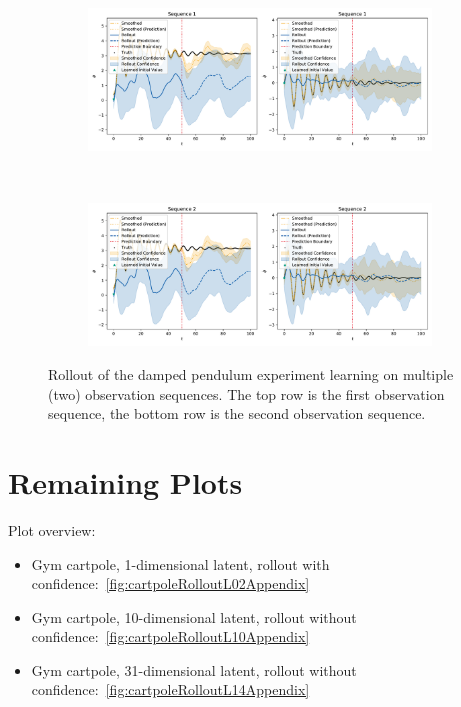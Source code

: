 	\begin{figure}
		\centering
		\begin{subfigure}{\linewidth}
			\includegraphics[width=\linewidth]{figures/results/single-vs-multi-sequence/pendulum-damped-multi/rollout-observations-N0.pdf}
		\end{subfigure} \\
		\begin{subfigure}{\linewidth}
			\includegraphics[width=\linewidth]{figures/results/single-vs-multi-sequence/pendulum-damped-multi/rollout-observations-N1.pdf}
		\end{subfigure}
		\caption{Rollout of the damped pendulum experiment learning on multiple (two) observation sequences. The top row is the first observation sequence, the bottom row is the second observation sequence.}
		\label{fig:plotsMultiSequence}
	\end{figure}

\section{Remaining Plots}
	\label{app:remainingPlots}

	Plot overview:
	\begin{itemize}
		\item Gym cartpole, 1-dimensional latent, rollout with confidence:~\autoref{fig:cartpoleRolloutL02Appendix}
		\item Gym cartpole, 10-dimensional latent, rollout without confidence:~\autoref{fig:cartpoleRolloutL10Appendix}
		\item Gym cartpole, 31-dimensional latent, rollout without confidence:~\autoref{fig:cartpoleRolloutL14Appendix}
	\end{itemize}

